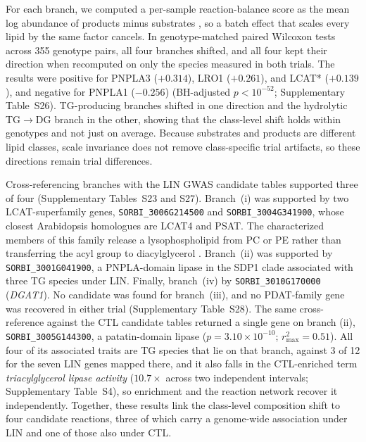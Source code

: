 \documentclass[9pt,twocolumn,twoside]{rilabRxiv}
\begin{document}
For each branch, we computed a per-sample reaction-balance score as the mean log abundance of products minus substrates \citep{Rose2023LINEX2, Gieger2008, Illig2010}, so a batch effect that scales every lipid by the same factor cancels. In genotype-matched paired Wilcoxon tests across 355 genotype pairs, all four branches shifted, and all four kept their direction when recomputed on only the species measured in both trials. The results were positive for PNPLA3 ($+0.314$), LRO1 ($+0.261$), and LCAT* ($+0.139$), and negative for PNPLA1 ($-0.256$) (BH-adjusted $p<10^{-52}$; Supplementary Table~S26). TG-producing branches shifted in one direction and the hydrolytic TG$\rightarrow$DG branch in the other, showing that the class-level shift holds within genotypes and not just on average. Because substrates and products are different lipid classes, scale invariance does not remove class-specific trial artifacts, so these directions remain trial differences.

Cross-referencing branches with the LIN GWAS candidate tables supported three of four (Supplementary Tables~S23 and S27). Branch~(i) was supported by two LCAT-superfamily genes, \texttt{SORBI\_3006G214500} and \texttt{SORBI\_3004G341900}, whose closest Arabidopsis homologues are LCAT4 and PSAT. The characterized members of this family release a lysophospholipid from PC or PE rather than transferring the acyl group to diacylglycerol \citep{Chen2012LCATPLA, Banas2005PSAT}. Branch~(ii) was supported by \texttt{SORBI\_3001G041900}, a PNPLA-domain lipase in the SDP1 clade associated with three TG species under LIN. Finally, branch~(iv) by \texttt{SORBI\_3010G170000} (\textit{DGAT1}). No candidate was found for branch~(iii), and no PDAT-family gene was recovered in either trial (Supplementary Table~S28). The same cross-reference against the CTL candidate tables returned a single gene on branch (ii), \texttt{SORBI\_3005G144300}, a patatin-domain lipase ($p = 3.10\times10^{-10}$; $r^2_{\max}=0.51$). All four of its associated traits are TG species that lie on that branch, against 3 of 12 for the seven LIN genes mapped there, and it also falls in the CTL-enriched term \textit{triacylglycerol lipase activity} ($10.7\times$ across two independent intervals; Supplementary Table~S4), so enrichment and the reaction network recover it independently. Together, these results link the class-level composition shift to four candidate reactions, three of which carry a genome-wide association under LIN and one of those also under CTL.
\end{document}
